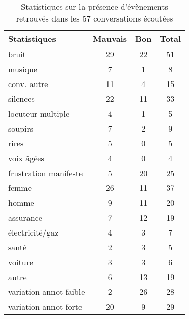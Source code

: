 \begin{table}[]
    \centering
    \begin{tabular}{p{3cm}|c c c}
         \hline
         Statistiques &Mauvais &Bon &Total \\
         \hline
         bruit &29 &22 &51 \\
         musique &7 &1 &8 \\
         conv. autre &11 &4 &15 \\
         silences &22 &11 &33 \\
         locuteur multiple &4 &1 &5 \\
         soupirs &7 &2 &9 \\
         rires &5 &0 &5 \\
         voix âgées &4 &0 &4 \\
         frustration manifeste &5 &20 &25 \\
         \hline
         femme &26 &11 &37 \\
         homme &9 &11 &20 \\
         \hline
         assurance &7 &12 &19 \\
         électricité/gaz &4 &3 &7 \\
         santé &2 &3 &5 \\
         voiture &3 &3 &6 \\
         autre &6 &13 &19 \\
         \hline
         variation annot faible &2 &26 &28 \\
         variation annot forte &20 &9 &29 \\
         \hline
    \end{tabular}
    \caption{Statistiques sur la présence d'évènements retrouvés dans les 57 conversations écoutées}
    \label{tab:stats}
\end{table}
